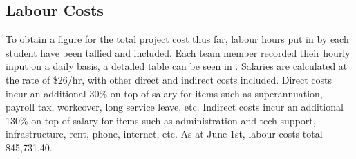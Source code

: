 \documentclass[main.tex]{subfiles}
\begin{document}
\subsection{Labour Costs}
To obtain a figure for the total project cost thus far, labour hours put in by each student have been tallied and included.  Each team member recorded their hourly input on a daily basis, a detailed table can be seen in . Salaries are calculated at the rate of \$26/hr, with other direct and indirect costs included. Direct costs incur an additional 30\% on top of salary for items such as superannuation, payroll tax, workcover, long service leave, etc. Indirect costs incur an additional 130\% on top of salary for items such as administration and tech support, infrastructure, rent, phone, internet, etc. As at June 1st, labour costs total \$45,731.40.
\end{document}
